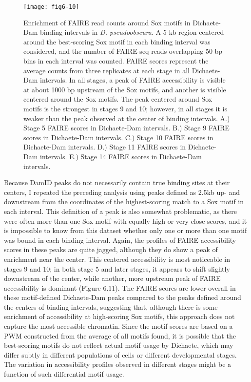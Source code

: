 \begin{figure}
\centering
\texttt{[image: fig6-10]}
\caption{Enrichment of FAIRE read counts around Sox motifs in Dichaete-Dam binding intervals in \emph{D. pseudoobscura}. A 5-kb region centered around the best-scoring Sox motif in each binding interval was considered, and the number of FAIRE-seq reads overlapping 50-bp bins in each interval was counted. FAIRE scores represent the average counts from three replicates at each stage in all Dichaete-Dam intervals. In all stages, a peak of FAIRE accessibility is visible at about 1000 bp upstream of the Sox motifs, and another is visible centered around the Sox motifs. The peak centered around Sox motifs is the strongest in stages 9 and 10; however, in all stages it is weaker than the peak observed at the center of binding intervals. A.) Stage 5 FAIRE scores in Dichaete-Dam intervals. B.) Stage 9 FAIRE scores in Dichaete-Dam intervals. C.) Stage 10 FAIRE scores in Dichaete-Dam intervals. D.) Stage 11 FAIRE scores in Dichaete-Dam intervals. E.) Stage 14 FAIRE scores in Dichaete-Dam intervals.}
\label{Figure 6.10}
\end{figure}

Because DamID peaks do not necessarily contain true binding sites at their centers, I repeated the preceding analysis using peaks defined as 2.5kb up- and downstream from the coordinates of the highest-scoring match to a Sox motif in each interval. This definition of a peak is also somewhat problematic, as there were often more than one Sox motif with equally high or very close scores, and it is impossible to know from this dataset whether only one or more than one motif was bound in each binding interval. Again, the profiles of FAIRE accessibility scores in these peaks are quite jagged, although they do show a peak of enrichment near the center. This centered accessibility is most noticeable in stages 9 and 10; in both stage 5 and later stages, it appears to shift slightly downstream of the center, while another, more upstream peak of FAIRE accessibility is dominant (Figure 6.11). The FAIRE scores are lower overall in these motif-defined Dichaete-Dam peaks compared to the peaks defined around the centers of binding intervals, suggesting that, although there is some enrichment of accessibility at high-scoring Sox motifs, this approach does not capture the most accessible chromatin. Since the motif scores are based on a PWM constructed from the average of all motifs found, it is possible that the best-scoring motifs do not reflect actual motif usage by Dichaete, which may differ subtly in different populations of cells or different developmental stages. The variation in accessibility profiles observed in different stages might be a function of such differential motif usage.\\

